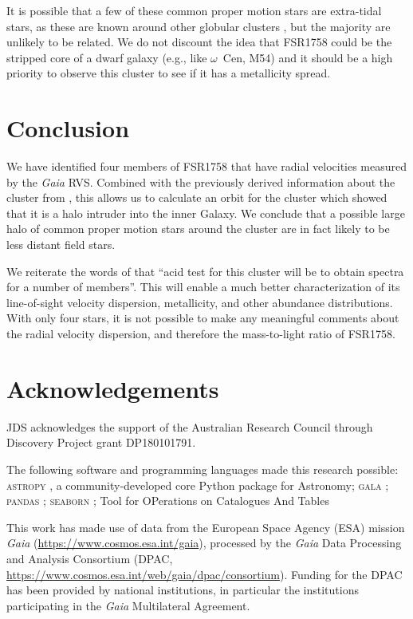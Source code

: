 \documentclass[fleqn,usenatbib,letters]{mnras}
\begin{document}
It is possible that a few of these common proper motion stars are extra-tidal stars, as these are known around other globular clusters \citep[e.g.,][]{Simpson:2017be}, but the majority are unlikely to be related. We do not discount the idea that FSR1758 could be the stripped core of a dwarf galaxy (e.g., like $\omega$~Cen, M54) and it should be a high priority to observe this cluster to see if it has a metallicity spread.

\section{Conclusion}
We have identified four members of FSR1758 that have radial velocities measured by the \textit{Gaia} RVS. Combined with the previously derived information about the cluster from , this allows us to calculate an orbit for the cluster which showed that it is a halo intruder into the inner Galaxy. We conclude that a possible large halo of common proper motion stars around the cluster are in fact likely to be less distant field stars. 

We reiterate the words of  that ``acid test for this cluster will be to obtain spectra for a number of members''. This will enable a much better characterization of its line-of-sight velocity dispersion, metallicity, and other abundance distributions. With only four stars, it is not possible to make any meaningful comments about the radial velocity dispersion, and therefore the mass-to-light ratio of FSR1758.

\section*{Acknowledgements}

JDS acknowledges the support of the Australian Research Council through Discovery Project grant DP180101791.

The following software and programming languages made this research possible: \textsc{astropy} \citep[v3.1;][]{TheAstropyCollaboration:2018ti,TheAstropyCollaboration2018}, a community-developed core Python package for Astronomy; \textsc{gala} \citep[v3.0;][]{Price-Whelan2017a,Price-Whelan2018b}; \textsc{pandas} \citep[v0.20.3;][]{McKinney:2010un}; \textsc{seaborn} \citep[v0.8.1;][]{Waskom2018}; Tool for OPerations on Catalogues And Tables \citep[\textsc{topcat}, v4.5;][]{Taylor:2005wx,Taylor:2006wv}

This work has made use of data from the European Space Agency (ESA) mission {\it Gaia} (\url{https://www.cosmos.esa.int/gaia}), processed by the {\it Gaia} Data Processing and Analysis Consortium (DPAC, \url{https://www.cosmos.esa.int/web/gaia/dpac/consortium}). Funding for the DPAC has been provided by national institutions, in particular the institutions participating in the {\it Gaia} Multilateral Agreement.
\end{document}

